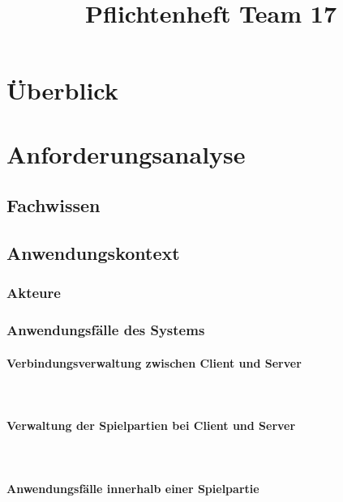 \documentclass{uulm-assignment}
\title{Pflichtenheft Team 17}
\begin{document}
\setcounter{secnumdepth}{4}

\maketitle

\tableofcontents


\clearpage
\section{Überblick}


\clearpage
\section{Anforderungsanalyse}
\subsection{Fachwissen}


\clearpage
\subsection{Anwendungskontext}
\subsubsection{Akteure}


\clearpage
\subsubsection{Anwendungsfälle des Systems}
\paragraph{Verbindungsverwaltung zwischen Client und Server} \mbox{}\\

\paragraph{Verwaltung der Spielpartien bei Client und Server} \mbox{}\\

\paragraph{Anwendungsfälle innerhalb einer Spielpartie} \mbox{}\\

\end{document}
